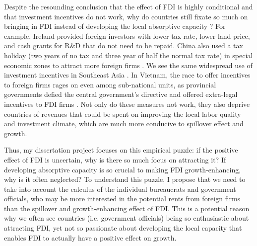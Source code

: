 \documentclass[12pt]{article}
\begin{document}
Despite the resounding conclusion that the effect of FDI is highly conditional and that investment incentives do not work, why do countries still fixate so much on bringing in FDI instead of developing the local absorptive capacity \citep{Blomstrom2002}? For example, Ireland provided foreign investors with lower tax rate, lower land price, and cash grants for R\&D that do not need to be repaid. China also used a tax holiday (two years of no tax and three year of half the normal tax rate) in special economic zones to attract more foreign firms \citep{Telford2001}. We see the same widespread use of investment incentives in Southeast Asia \citep{Fletcher2002}. In Vietnam, the race to offer incentives to foreign firms rages on even among sub-national units, as provincial governments defied the central government's directive and offered extra-legal incentives to FDI firms \citep{Vu2007}. Not only do these measures not work, they also deprive countries of revenues that could be spent on improving the local labor quality and investment climate, which are much more conducive to spillover effect and growth.

Thus, my dissertation project focuses on this empirical puzzle: if the positive effect of FDI is uncertain, why is there so much focus on attracting it? If developing absorptive capacity is so crucial to making FDI growth-enhancing, why is it often neglected? To understand this puzzle, I propose that we need to take into account the calculus of the individual bureaucrats and government officials, who may be more interested in the potential rents from foreign firms than the spillover and growth-enhancing effect of FDI. This is a potential reason why we often see countries (i.e. government officials) being so enthusiastic about attracting FDI, yet not so passionate about developing the local capacity that enables FDI to actually have a positive effect on growth.
\end{document}
